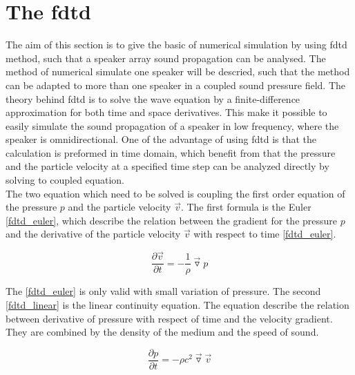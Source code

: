 \section{The \gls{fdtd}}
The aim of this section is to give the basic of numerical simulation by using \gls{fdtd} method, such that a speaker array sound propagation can be analysed. The method of numerical simulate one speaker will be descried, such that the method can be adapted to more than one speaker in a coupled sound pressure field. 
The theory behind \gls{fdtd} is to solve the wave equation by a finite-difference approximation for both time and space derivatives. This make it possible to easily simulate the sound propagation of a speaker in low frequency, where the speaker is omnidirectional. One of the advantage of using \gls{fdtd} is that the calculation is preformed in time domain, which benefit from that the pressure and the particle velocity at a specified time step can be analyzed directly by solving to coupled equation.\citep{fdtddaga}\\


The two equation which need to be solved is coupling the first order equation of the pressure $p$ and the particle velocity $\vec{v}$. The first formula is the Euler \autoref{fdtd_euler}, which describe the relation between the gradient for the pressure $p$ and the derivative of the particle velocity $\vec{v}$ with respect to time \autoref{fdtd_euler}. 

\begin{equation}\label{fdtd_euler}
\frac{\partial \vec{v}}{\partial t} =- \frac{1}{\rho}\vec{\triangledown }p
\end{equation}

    \startexplain
    \stopexplain

The \autoref{fdtd_euler} is only valid with small variation of pressure. The second \autoref{fdtd_linear} is the linear continuity equation. The equation describe the relation between derivative of pressure with respect of time and the velocity gradient. They are combined by the density of the medium and the speed of sound. 

 \begin{equation}\label{fdtd_linear}
\frac{\partial p}{\partial t} =- \rho c^2 \vec{\triangledown }\vec{v}
\end{equation}

